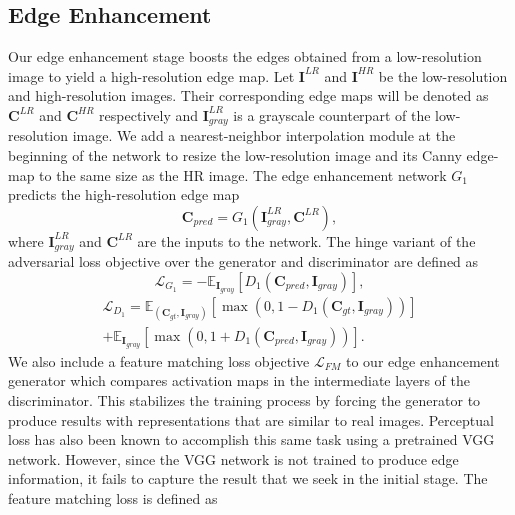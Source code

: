 \documentclass[10pt,twocolumn,letterpaper]{article}
\begin{document}
\subsection{Edge Enhancement}
Our edge enhancement stage boosts the edges obtained from a low-resolution image to yield a high-resolution edge map. Let $\mathbf{I}^{LR}$ and $\mathbf{I}^{HR}$ be the low-resolution and high-resolution images. Their corresponding edge maps will be denoted as $\mathbf{C}^{LR}$ and $\mathbf{C}^{HR}$ respectively and $\mathbf{I}^{LR}_{gray}$ is a grayscale counterpart of the low-resolution image. We add a nearest-neighbor interpolation module at the beginning of the network to resize the low-resolution image and its Canny edge-map to the same size as the HR image. The edge enhancement network $G_{1}$ predicts the high-resolution edge map
\begin{equation}
    \mathbf{C}_{pred} = G_1(\mathbf{I}^{LR}_{gray},\mathbf{C}^{LR}),
\label{eq:HR_edgemap}
\end{equation}
where $\mathbf{I}^{LR}_{gray}$ and $\mathbf{C}^{LR}$ are the inputs to the network. The hinge variant \cite{miyato2018spectral} of the adversarial loss objective over the generator and discriminator are defined as
\begin{equation}
	\mathcal{L}_{G_1} = - \mathbb{E}_{\mathbf{I}_{gray}} \left[ D_1 (\mathbf{C}_{pred}, \mathbf{I}_{gray}) \right],
	\label{eq:g1loss}
\end{equation}
\begin{multline}
	\mathcal{L}_{D_1} = \mathbb{E}_{(\mathbf{C}_{gt},\mathbf{I}_{gray})} \left[ \max (0, 1 - D_1 (\mathbf{C}_{gt}, \mathbf{I}_{gray})) \right] \\
	+ \mathbb{E}_{\mathbf{I}_{gray}} \left[ \max (0, 1 + D_1 (\mathbf{C}_{pred}, \mathbf{I}_{gray})) \right].
	\label{eq:d1loss}
\end{multline}
We also include a feature matching loss objective $\mathcal{L}_{FM}$ \cite{wang2018high} to our edge enhancement generator which compares activation maps in the intermediate layers of the discriminator. This stabilizes the training process by forcing the generator to produce results with representations that are similar to real images. Perceptual loss \cite{johnson2016perceptual,gatys2016image,gatys2015texture} has also been known to accomplish this same task using a pretrained VGG network. However, since the VGG network is not trained to produce edge information, it fails to capture the result that we seek in the initial stage. The feature matching loss is defined as
\end{document}
